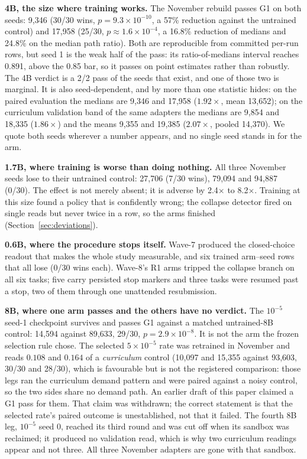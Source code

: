 \documentclass[11pt]{article}
\begin{document}
\textbf{4B, the size where training works.} The November rebuild passes G1 on both seeds: 9{,}346
(30/30 wins, $p = 9.3\times10^{-10}$, a 57\% reduction against the untrained control) and 17{,}958
(25/30, $p \approx 1.6\times10^{-4}$, a 16.8\% reduction of medians and 24.8\% on the median path
ratio). Both are reproducible from committed per-run rows, but seed 1 is the weak half of the pass: its
ratio-of-medians interval reaches 0.891, above the 0.85 bar, so it passes on point estimates rather
than robustly. The 4B verdict is a 2/2 pass of the seeds that exist, and one of those two is marginal. It is also seed-dependent, and by more than one statistic hides: on the paired evaluation the
medians are 9{,}346 and 17{,}958 ($1.92\times$, mean 13{,}652); on the curriculum validation band of
the same adapters the medians are 9{,}854 and 18{,}335 ($1.86\times$) and the means 9{,}355 and
19{,}385 ($2.07\times$, pooled 14{,}370). We quote both seeds wherever a number appears, and no single
seed stands in for the arm.

\textbf{1.7B, where training is worse than doing nothing.} All three November seeds lose to their
untrained control: 27{,}706 (7/30 wins), 79{,}094 and 94{,}887 (0/30). The effect is not merely absent;
it is adverse by 2.4$\times$ to 8.2$\times$. Training at this size found a policy that is confidently
wrong; the collapse detector fired on single reads but never twice in a row, so the arms finished
(Section~\ref{sec:deviations}).

\textbf{0.6B, where the procedure stops itself.} Wave-7 produced the closed-choice readout that makes
the whole study measurable, and six trained arm--seed rows that all lose (0/30 wins each). Wave-8's R1
arms tripped the collapse branch on all six tasks; five carry persisted stop markers and three tasks
were resumed past a stop, two of them through one unattended resubmission.

\textbf{8B, where one arm passes and the others have no verdict.} The $10^{-5}$ seed-1 checkpoint
survives and passes G1 against a matched untrained-8B control: 14{,}594 against 89{,}633, 29/30,
$p = 2.9\times10^{-8}$.
It is not the arm the frozen selection rule chose. The selected $5\times10^{-5}$ rate was retrained in
November and reads $0.108$ and $0.164$ of a \emph{curriculum} control (10{,}097 and 15{,}355 against
93{,}603, 30/30 and 28/30), which is favourable but is not the registered comparison: those legs ran
the curriculum demand pattern and were paired against a noisy control, so the two sides share no demand
path. An earlier draft of this paper claimed a G1 pass for them. That claim was withdrawn; the correct
statement is that the selected rate's paired outcome is unestablished, not that it failed. The fourth
8B leg, $10^{-5}$ seed 0, reached its third round and was cut off when its sandbox was reclaimed; it
produced no validation read, which is why two curriculum readings appear and not three. All three
November adapters are gone with that sandbox.
\end{document}
